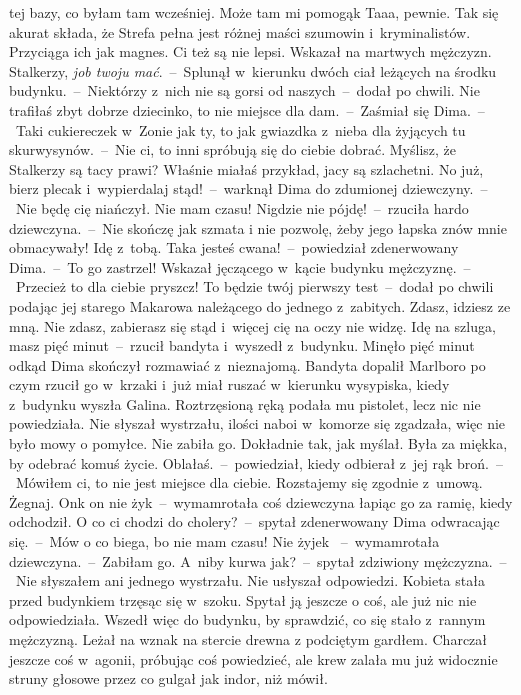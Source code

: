 \documentclass[../MAIN.tex]{subfiles}
\begin{document}
tej bazy, co byłam tam wcześniej. Może tam mi pomogą\3k
\xx  Taaa, pewnie. Tak się akurat składa, że Strefa pełna jest różnej maści
szumowin i~kryminalistów. Przyciąga ich jak magnes. Ci też są nie lepsi.
Wskazał na martwych mężczyzn.
\xx  Stalkerzy, \textit{job twoju mać}.~--~Splunął w~kierunku dwóch ciał leżących
na środku budynku.~--~Niektórzy z~nich nie są gorsi od naszych~--~dodał po
chwili.
\xx  Nie trafiłaś zbyt dobrze dziecinko, to nie miejsce dla dam.~--~Zaśmiał się
Dima.~--~Taki cukiereczek w~Zonie jak ty, to jak gwiazdka z~nieba dla żyjących
tu skurwysynów.~--~Nie ci, to inni spróbują się do ciebie dobrać. Myślisz, że
Stalkerzy są tacy prawi? Właśnie miałaś przykład, jacy są szlachetni. No już,
bierz plecak i~wypierdalaj stąd!~--~warknął Dima do zdumionej dziewczyny.~--~Nie
będę cię niańczył. Nie mam czasu!
\xx  Nigdzie nie pójdę!~--~rzuciła hardo dziewczyna.~--~Nie skończę jak szmata i nie pozwolę, żeby jego łapska znów mnie obmacywały!
Idę z~tobą.
\xx  Taka jesteś cwana!~--~powiedział zdenerwowany Dima.~--~To go zastrzel! \x
Wskazał jęczącego w~kącie budynku mężczyznę.~--~Przecież to dla ciebie pryszcz!
To będzie twój pierwszy test~--~dodał po chwili podając jej starego Makarowa
należącego do jednego z~zabitych.
\xx  Zdasz, idziesz ze mną. Nie zdasz, zabierasz się stąd i~więcej cię na oczy nie
widzę. Idę na szluga, masz pięć minut~--~rzucił bandyta i~wyszedł z~budynku.
\qm
Minęło pięć minut odkąd Dima skończył rozmawiać z~nieznajomą. Bandyta dopalił
Marlboro po czym rzucił go w~krzaki i~już miał ruszać w~kierunku wysypiska,
kiedy z~budynku wyszła Galina. Roztrzęsioną ręką podała mu pistolet, lecz nic
nie powiedziała. Nie słyszał wystrzału, ilości naboi w~komorze się zgadzała,
więc nie było mowy o pomyłce. Nie zabiła go. Dokładnie tak, jak myślał. Była za miękka, by odebrać komuś życie.
%
\sx Oblałaś.~--~powiedział, kiedy odbierał z~jej rąk broń.~--~Mówiłem ci, to nie
jest miejsce dla ciebie. Rozstajemy się zgodnie z~umową. Żegnaj.
\xx  On\3k on nie ży\3k~--~wymamrotała coś dziewczyna łapiąc go za ramię,
kiedy odchodził.
\xx  O co ci chodzi do cholery?~--~spytał zdenerwowany Dima odwracając się.~--~Mów
o co biega, bo nie mam czasu!
\xx  Nie żyje\3k ~--~wymamrotała dziewczyna.~--~Zabiłam go.
\xx  A~niby kurwa jak?~--~spytał zdziwiony mężczyzna.~--~Nie słyszałem ani jednego
wystrzału.
\qm
Nie usłyszał odpowiedzi. Kobieta sta\-ła przed budynkiem trzęsąc się w~szoku.
Spytał ją jeszcze o coś, ale już nic nie odpowiedziała. Wszedł więc do budynku,
by sprawdzić, co się stało z~rannym mężczyzną.
Leżał na wznak na stercie drewna
z podciętym gardłem. Charczał jeszcze coś w~agonii, próbując coś powiedzieć, ale krew zalała mu już widocznie struny głosowe przez co gulgał jak indor, niż mówił.
\end{document}
